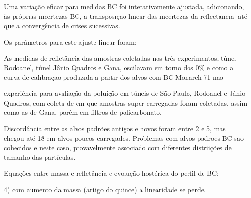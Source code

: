 Uma variação eficaz para medidas BC foi interativamente ajustada, adicionando, às próprias incertezas BC, a transposição linear das incertezas da reflectância, até que a convergência de crises sucessivas.

Os parâmetros para este ajuste linear foram:






 

As medidas de refletância das amostras coletadas nos três experimentos, 
túnel Rodoanel, túnel Jânio Quadros e Gana, oscilavam em torno dos 0\% e como
a curva de calibração produzida a partir dos alvos com BC Monarch 71 não

experiência para avaliação da poluição em túneis de São Paulo, 
Rodoanel e Jânio Quadros, com coleta de   em que amostras super carregadas foram coletadas, 
assim como as de Gana, porém em filtros de policarbonato.


Discordância entre os alvos padrões antigos e novos foram entre 2 e 5, mas chegou 
até 18 em alvos poucos carregados. Problemas com alvos padrões BC são cohecidos e 
neste caso, provavelmente associado com diferentes distriições de tamanho das partículas.





Equações entre massa e refletância e evolução hostórica do perfil de BC:

4) com aumento da massa (artigo do quince) a linearidade se perde. 



